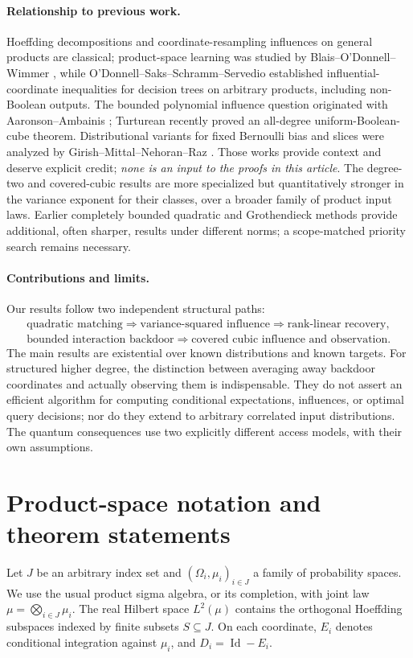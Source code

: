 \documentclass[11pt,letterpaper]{article}
\theoremstyle{definition}
\begin{document}
\paragraph{Relationship to previous work.}
Hoeffding decompositions and coordinate-resampling influences on general
products are classical; product-space learning was studied by
Blais--O'Donnell--Wimmer \cite{BOW2008}, while O'Donnell--Saks--Schramm--Servedio
\cite{OSSS2005} established influential-coordinate inequalities for decision
trees on arbitrary products, including non-Boolean outputs. The bounded
polynomial influence question originated with Aaronson--Ambainis
\cite{AA2014}; Turturean \cite{Turturean2026} recently proved an all-degree
uniform-Boolean-cube theorem. Distributional variants for fixed Bernoulli bias
and slices were analyzed by Girish--Mittal--Nehoran--Raz \cite{GMNR2026}.
Those works provide context and deserve explicit credit; \emph{none is an
input to the proofs in this article}. The degree-two and covered-cubic results are more
specialized but quantitatively stronger in the variance exponent for their
classes, over a broader family of product input laws. Earlier completely bounded quadratic and Grothendieck
methods provide additional, often sharper, results under different norms\cite{AIAKS2016,ODZ2016};
a scope-matched priority search remains necessary.

\paragraph{Contributions and limits.}
Our results follow two independent structural paths:
\[\begin{gathered}
\text{quadratic matching}\Longrightarrow\text{variance-squared influence}\Longrightarrow\text{rank-linear recovery},\\
\text{bounded interaction backdoor}\Longrightarrow\text{covered cubic influence and observation}.
\end{gathered}\]
The main results are existential over known distributions and known targets. For structured higher degree, the distinction between averaging away backdoor coordinates and actually observing them is indispensable.
They do not assert an efficient algorithm for computing conditional
expectations, influences, or optimal query decisions; nor do they extend to
arbitrary correlated input distributions. The quantum consequences use two
explicitly different access models, with their own assumptions.

\section{Product-space notation and theorem statements}\label{sec:setup}
Let $J$ be an arbitrary index set and $(\Omega_i,\mu_i)_{i\in J}$ a family
of probability spaces. We use the usual product sigma algebra, or its
completion, with joint law $\mu=\bigotimes_{i\in J}\mu_i$. The real Hilbert
space $L^2(\mu)$ contains the orthogonal Hoeffding subspaces indexed by
finite subsets $S\subseteq J$. On each coordinate, $E_i$ denotes conditional
integration against $\mu_i$, and $D_i=\operatorname{Id}-E_i$.
\end{document}
